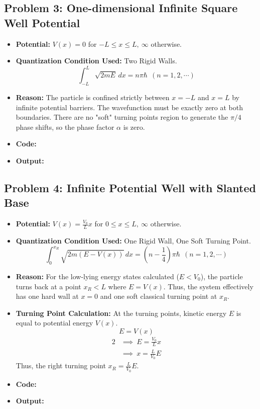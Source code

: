 \documentclass[12pt, a4paper, twoside]{article}
\begin{document}
        \subsection{Problem 3: One-dimensional Infinite Square Well Potential}
        \begin{itemize}
            \item {\bf Potential: } $V(x) = 0$ for $-L \leq x \leq L, ~\infty$ otherwise.
            \item {\bf Quantization Condition Used: } Two Rigid Walls. $${\int_{-L}^{L} \sqrt{2mE} \, dx} = {n \pi \hbar} ~~ (n = 1, 2, \cdots)$$
            \item {\bf Reason: }  The particle is confined strictly between $x=-L$ and $x=L$ by infinite potential barriers. The wavefunction must be exactly zero at both boundaries. There are no "soft" turning points region to generate the $\pi/4$ phase shifts, so the phase factor $\alpha$ is zero.
            \item {\bf Code: } 
            \item {\bf Output: } 
        \end{itemize}
        
        \subsection{Problem 4: Infinite Potential Well with Slanted Base}
        \begin{itemize}
            \item {\bf Potential: } $V(x) = \frac{V_0}{L} x$ for $0 \leq x \leq L, ~\infty$ otherwise.
            \item {\bf Quantization Condition Used: } One Rigid Wall, One Soft Turning Point. $${\int_{0}^{x_R} \sqrt{2m(E-V(x))} \, dx} = {\left(n - \frac{1}{4}\right) \pi \hbar} ~~ (n = 1, 2, \cdots)$$
            \item {\bf Reason: }  For the low-lying energy states calculated ($E < V_0$), the particle turns back at a point $x_R < L$ where $E=V(x)$. Thus, the system effectively has one hard wall at $x=0$ and one soft classical turning point at $x_R$.
            \item {\bf Turning Point Calculation: } At the turning points, kinetic energy $E$ is equal to potential energy $V(x)$. $$E = V(x)$$ \begin{alignat*}{2}
                &\implies ~ E = \frac{V_0}{L} x \\
                &\implies ~ x = \frac{L}{V_0} E
            \end{alignat*}
            Thus, the right turning point $ \boxed{x_R = \frac{L}{V_0} E}$.
            \item {\bf Code: } 
            \item {\bf Output: } 
        \end{itemize}
        
\end{document}
